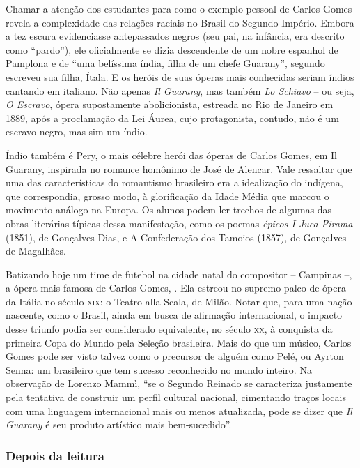 \documentclass[11pt]{extarticle}
\begin{document}
Chamar a atenção dos estudantes para como o exemplo pessoal de Carlos Gomes
revela a complexidade das relações raciais no Brasil do Segundo Império. Embora
a tez escura evidenciasse antepassados negros (seu pai, na infância, era
descrito como “pardo”), ele oficialmente se dizia descendente de um nobre
espanhol de Pamplona e de “uma belíssima índia, filha de um chefe Guarany”,
segundo escreveu sua filha, Ítala. E os heróis de suas óperas mais conhecidas
seriam índios cantando em italiano. Não apenas \emph{Il Guarany}, mas também \emph{Lo
Schiavo} – ou seja, \emph{O Escravo}, ópera supostamente abolicionista, estreada no Rio
de Janeiro em 1889, após a proclamação da Lei Áurea, cujo protagonista,
contudo, não é um escravo negro, mas sim um índio.

Índio também é Pery, o mais célebre herói das óperas de Carlos Gomes, em Il
Guarany, inspirada no romance homônimo de José de Alencar. Vale ressaltar que
uma das características do romantismo brasileiro era a idealização do indígena,
que correspondia, grosso modo, à glorificação da Idade Média que marcou o
movimento análogo na Europa. Os alunos podem ler trechos de algumas das obras
literárias  típicas dessa manifestação, como os poemas \emph{épicos I-Juca-Pirama}
(1851), de Gonçalves Dias, e A Confederação dos Tamoios (1857), de Gonçalves de
Magalhães.

Batizando hoje um time de futebol na cidade natal do compositor – Campinas –, a
ópera mais famosa de Carlos Gomes, . Ela estreou no supremo palco de ópera da Itália no
século \textsc{xix}: o Teatro alla Scala, de Milão. Notar que, para uma nação nascente,
como o Brasil, ainda em busca de afirmação internacional, o impacto desse
triunfo podia ser considerado equivalente, no século \textsc{xx}, à conquista da
primeira Copa do Mundo pela Seleção brasileira. Mais do que um músico, Carlos
Gomes pode ser visto talvez como o precursor de alguém como Pelé, ou Ayrton
Senna: um brasileiro que tem sucesso reconhecido no mundo inteiro. Na
observação de Lorenzo Mammì, “se o Segundo Reinado se caracteriza justamente
pela tentativa de construir um perfil cultural nacional, cimentando traços
locais com uma linguagem internacional mais ou menos atualizada, pode se dizer
que \emph{Il Guarany} é seu produto artístico mais bem-sucedido”.

\subsubsection{Depois da leitura}
\end{document}
